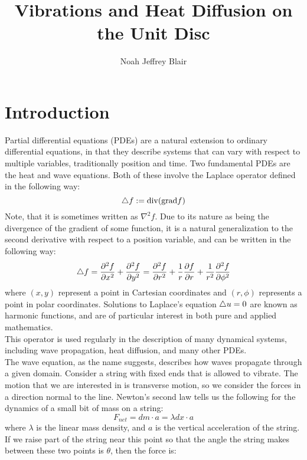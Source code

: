 \documentclass{paper}
\author{Noah Jeffrey Blair}
\title{Vibrations and Heat Diffusion on the Unit Disc}
\begin{document}
\maketitle
\tableofcontents
\begin{abstract}

\end{abstract}
\section{Introduction}
Partial differential equations (PDEs) are a natural extension to  ordinary differential equations, in that they describe systems that can vary with respect to multiple variables, traditionally position and time. Two fundamental PDEs are the heat and wave equations. Both of these involve the Laplace operator defined in the following way:
\begin{equation}
  \bigtriangleup f := \mathrm{div}(\mathrm{grad} f)
\end{equation}
Note, that it is sometimes written as $\nabla^2 f$. Due to its nature as being the divergence of the gradient of some function, it is a natural generalization to the second derivative with respect to a position variable, and can be written in the following way:
\begin{equation}
  \bigtriangleup f = \frac{\partial ^2 f}{\partial x^2}+\frac{\partial ^2 f}{\partial y^2}= \frac{\partial ^2 f}{\partial r^2}+\frac{1}{r}\frac{\partial f}{\partial r}+\frac{1}{r^2}\frac{\partial ^2 f}{\partial \phi^2}
\end{equation}
where $(x,y)$ represent a point in Cartesian coordinates and $(r,\phi)$ represents a point in polar coordinates. Solutions to Laplace's equation $\bigtriangleup u = 0$ are known as harmonic functions, and are of particular interest in both pure and applied mathematics.\\
This operator is used regularly in the description of many dynamical systems, including wave propagation, heat diffusion, and many other PDEs.\\
The wave equation, as the name suggests, describes how waves propagate through a given domain. Consider a string with fixed ends that is allowed to vibrate. The motion that we are interested in is transverse motion, so we consider the forces in a direction normal to the line. Newton's second law tells us the following for the dynamics of a small bit of mass on a string:
\begin{equation}
    F_{net}=dm\cdot a=\lambda dx \cdot a
\end{equation}
where $\lambda$ is the linear mass density, and $a$ is the vertical acceleration of the string. If we raise part of the string near this point so that the angle the string makes between these two points is $\theta$, then the force is:
\end{document}
